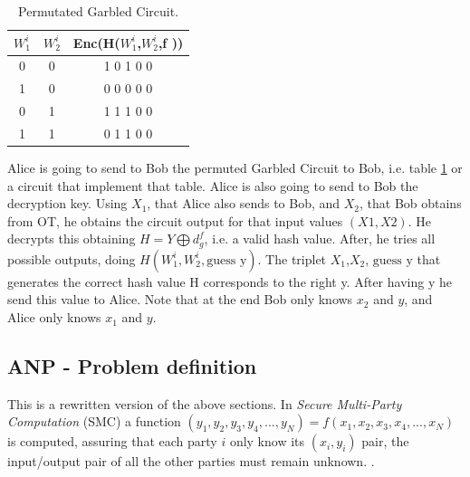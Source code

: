 \begin{refsection}
\begin{table}[H]
    \centering
    \begin{tabular}{|cc|c|}
    \hline
    $W_1^i$ & $W_2^i$   & Enc(H($W_1^i$,$W_2^i$,f ))         \\ \hline
    0       & 0         & 1 0 1 0 0                          \\
    1       & 0         & 0 0 0 0 0                          \\
    0       & 1         & 1 1 1 0 0                          \\
    1       & 1         & 0 1 1 0 0                          \\ \hline
    \end{tabular}
    \caption{Permutated Garbled Circuit.}
    \label{tb:summary}
\end{table}
Alice is going to send to Bob the permuted Garbled Circuit to Bob, i.e. table \ref{tb:summary} or a circuit that implement that table. Alice is also going to send to Bob the decryption key. Using $X_1$, that Alice also sends to Bob, and $X_2$, that Bob obtains from OT, he obtains the circuit output for that input values $(X1, X2)$. He decrypts this obtaining $H=Y \bigoplus d_g^f$, i.e. a valid hash value. After, he tries all possible outputs, doing $H(W_1^i, W_2^i, \textrm{guess y})$. The triplet $X_1$,$X_2$, $\textrm{guess y}$ that generates the correct hash value H corresponds to the right y.
After having y he send this value to Alice. Note that at the end Bob only knows $x_2$ and $y$, and Alice only knows $x_1$ and $y$.

\newpage


\subsection{ANP - Problem definition}

This is a rewritten version of the above sections. In \emph{Secure Multi-Party Computation} (SMC) a function $(y_1,y_2,y_3,y_4,...,y_N)=f(x_1,x_2,x_3,x_4,...,x_N)$ is computed, assuring that each party $i$ only know its $\left(x_i, y_i\right)$ pair, the input/output pair of all the other parties must remain unknown. \cite{Naumann16}.


\end{refsection}
